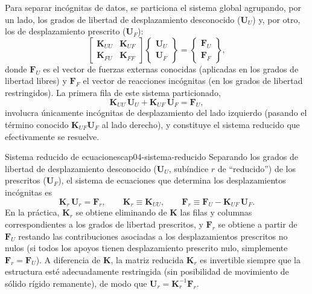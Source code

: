 Para separar incógnitas de datos, se particiona el sistema global agrupando, por un lado, los grados de libertad de desplazamiento desconocido ($\mathbf{U}_U$) y, por otro, los de desplazamiento prescrito ($\mathbf{U}_F$):
\[
\begin{bmatrix} \mathbf{K}_{UU} & \mathbf{K}_{UF} \\ \mathbf{K}_{FU} & \mathbf{K}_{FF} \end{bmatrix}
\begin{Bmatrix} \mathbf{U}_U \\ \mathbf{U}_F \end{Bmatrix}
=
\begin{Bmatrix} \mathbf{F}_U \\ \mathbf{F}_F \end{Bmatrix},
\]
donde $\mathbf{F}_U$ es el vector de fuerzas externas conocidas (aplicadas en los grados de libertad libres) y $\mathbf{F}_F$ el vector de reacciones incógnitas (en los grados de libertad restringidos). La primera fila de este sistema particionado,
\[
\mathbf{K}_{UU}\,\mathbf{U}_U + \mathbf{K}_{UF}\,\mathbf{U}_F = \mathbf{F}_U ,
\]
involucra únicamente incógnitas de desplazamiento del lado izquierdo (pasando el término conocido $\mathbf{K}_{UF}\mathbf{U}_F$ al lado derecho), y constituye el sistema reducido que efectivamente se resuelve.

\begin{ecnimportante}{Sistema reducido de ecuaciones}{cap04-sistema-reducido}
Separando los grados de libertad de desplazamiento desconocido ($\mathbf{U}_U$, subíndice $r$ de ``reducido'') de los prescritos ($\mathbf{U}_F$), el sistema de ecuaciones que determina los desplazamientos incógnitas es
\[
\mathbf{K}_r\,\mathbf{U}_r = \mathbf{F}_r, \qquad
\mathbf{K}_r \equiv \mathbf{K}_{UU}, \qquad
\mathbf{F}_r \equiv \mathbf{F}_U - \mathbf{K}_{UF}\,\mathbf{U}_F .
\]
En la práctica, $\mathbf{K}_r$ se obtiene eliminando de $\mathbf{K}$ las filas y columnas correspondientes a los grados de libertad prescritos, y $\mathbf{F}_r$ se obtiene a partir de $\mathbf{F}_U$ restando las contribuciones asociadas a los desplazamientos prescritos no nulos (si todos los apoyos tienen desplazamiento prescrito nulo, simplemente $\mathbf{F}_r=\mathbf{F}_U$). A diferencia de $\mathbf{K}$, la matriz reducida $\mathbf{K}_r$ es invertible siempre que la estructura esté adecuadamente restringida (sin posibilidad de movimiento de sólido rígido remanente), de modo que $\mathbf{U}_r = \mathbf{K}_r^{-1}\mathbf{F}_r$.
\end{ecnimportante}

